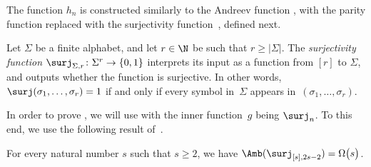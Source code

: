 The function $h_{n}$ is constructed similarly to the Andreev function
\cite{A87}, with the parity function replaced with the surjectivity
function~\cite{BM12}, defined next.
\begin{definition}
\label{def:surjectivity}Let $\Sigma$ be a finite alphabet, and let $r\in\N$
be such that $r\ge\left|\Sigma\right|$. The \emph{surjectivity function}
$\surj_{\Sigma,r}\colon\Sigma^{r}\to\{0,1\}$ interprets its input
as a function from $\left[r\right]$ to $\Sigma$, and outputs whether
the function is surjective. In other words, $\surj(\sigma_{1},\ldots,\sigma_{r})=1$
if and only if every symbol in~$\Sigma$ appears in~$(\sigma_{1},\ldots,\sigma_{r})$.
\end{definition}

In order to prove , we will use 
with the inner function~$g$ being $\surj_{n}$. To this end, we
use the following result of~\cite{BM12}.
\begin{lemma}[\cite{BM12}]
\label{lemma:surj-amb}For every natural number $s$ such that $s\ge2$,
we have $\Amb(\surj_{\left[s\right],2s-2})=\Omega\bigl(s\bigr)$. 
\end{lemma}

